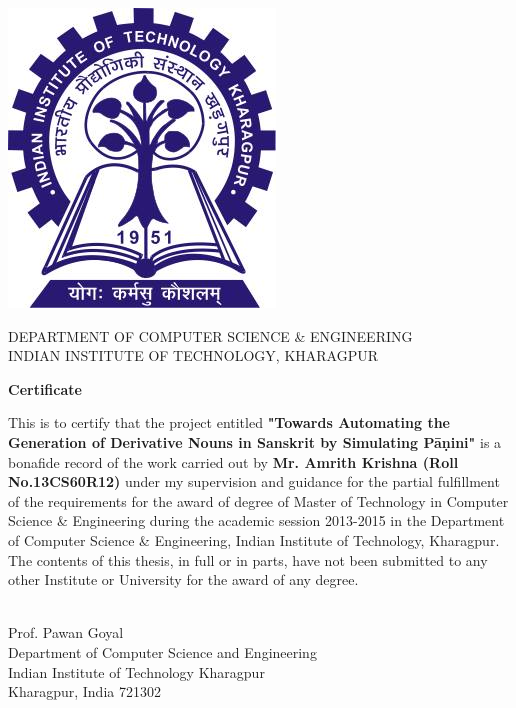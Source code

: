 \documentclass[a4paper,11pt,twoside,openright]{report}
\begin{document}
\newpage
\begin{center}
\includegraphics[scale=.5]{logo.png} 
\end{center}
\begin{center}
{\large DEPARTMENT OF COMPUTER SCIENCE \& ENGINEERING} \\[0.3\baselineskip] %
{\large INDIAN INSTITUTE OF TECHNOLOGY, KHARAGPUR}\par %
\vspace{20 mm}
{\bf \Large{Certificate}}
\end{center}
\onehalfspacing
This is to certify that the project entitled \textbf{"Towards Automating the Generation of Derivative Nouns in Sanskrit by Simulating Pāṇini"} is a bonafide record of the work carried out by \textbf{Mr. Amrith Krishna (Roll No.13CS60R12)} under my supervision and guidance for the partial fulfillment of the requirements for the award of degree of Master of Technology in Computer Science \& Engineering during the academic session 2013-2015 in the Department of Computer Science \& Engineering, Indian Institute of Technology, Kharagpur.\\
The contents of this thesis, in full or in parts, have not been submitted to any other Institute or University for the award of any degree.
\vspace{20pt}
\begin{flushright}
\makebox[1.5in]{\hrulefill}\\
Prof. Pawan Goyal\\
Department of Computer Science and Engineering\\
Indian Institute of Technology Kharagpur\\
Kharagpur, India 721302\\
\date{\today}
\end{flushright}
\newpage
\end{document}
